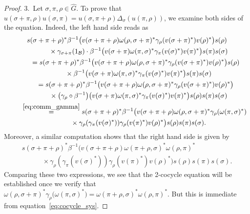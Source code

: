 \documentclass[10pt,a4paper]{amsart}
\numberwithin{equation}{section}
\newcommand*{\alg}{\mathcal}		%
\newcommand*{\one}{1}				%
\newcommand*{\aB}{\alg{B}} 			%
\begin{document}
\begin{proof}
3.~Let $\sigma, \pi, \rho \in \hat G$.
	To prove that $u(\sigma + \pi, \rho) u(\sigma, \pi)
	= u(\sigma, \pi + \rho) \Delta_\sigma ( u(\pi, \rho) )$, we examine both sides of the equation.
	Indeed, the left hand side reads as
	\begin{gather*}
s(\sigma + \pi + \rho)^* \beta^{-1}\big( v(\sigma + \pi + \rho) \omega(\rho,\sigma + \pi)^* \gamma_\rho (v(\sigma + \pi)^* ) v(\rho)^* \big) s(\rho)
		\\
\ \qquad\quad {}\times \gamma_{\sigma + \pi}(\one_\aB) \cdot \beta^{-1}\big( v(\sigma + \pi) \omega(\pi,\sigma)^* \gamma_\pi (v(\sigma)^* ) v(\pi)^*\big) s(\pi) s(\sigma)
		\\
\ \qquad{} =
		 s(\sigma + \pi + \rho)^* \beta^{-1}\big( v(\sigma + \pi + \rho) \omega(\rho,\sigma + \pi)^* \gamma_\rho (v(\sigma + \pi)^* ) v(\rho)^* \big) s(\rho)
		\\
\ \qquad\quad {} \times \beta^{-1}\big( v(\sigma + \pi) \omega(\pi,\sigma)^* \gamma_\pi (v(\sigma)^* ) v(\pi)^*\big) s(\pi) s(\sigma)
		\\
\ \qquad {} = s(\sigma + \pi + \rho)^* \beta^{-1}\big( v(\sigma + \pi + \rho) \omega(\rho,\sigma + \pi)^* \gamma_\rho (v(\sigma + \pi)^* ) v(\rho)^* \big)
		\\
\ \qquad \quad {}\times \big(\gamma_\rho \circ \beta^{-1} \big) \big( v(\sigma + \pi) \omega(\pi,\sigma)^* \gamma_\pi (v(\sigma)^* ) v(\pi)^*\big) s(\rho) s(\pi) s(\sigma)
		\\
\qquad{} \overset{\eqref{eq:comm_gamma}} {=}
		 s(\sigma + \pi + \rho)^* \beta^{-1}\big( v(\sigma + \pi + \rho) \omega(\rho,\sigma + \pi)^* \gamma_\rho ( \omega(\pi,\sigma)^* )
		\\
\ \qquad \quad {} \times \gamma_\rho ( \gamma_\pi ( v(\sigma)^* ) ) \gamma_\rho ( v(\pi)^* ) v(\rho)^* \big) s(\rho) s(\pi) s(\sigma).
	\end{gather*}
	Moreover, a similar computation shows that the right hand side is given by
	\begin{gather*}
	 s(\sigma + \pi +\rho)^* \beta^{-1}\big( v(\sigma + \pi + \rho) \omega(\pi + \rho,\sigma)^* \omega(\rho,\pi)^*
		\\			
\qquad \quad{}\times \gamma_\rho ( \gamma_\pi ( v(\sigma)^* ) ) \gamma_\rho ( v(\pi)^* ) v(\rho)^* \big) s(\rho) s(\pi) s(\sigma).	
	\end{gather*}
	Comparing these two expressions, we see that the 2-cocycle equation will be established once we verify that $\omega(\rho,\sigma + \pi)^* \gamma_\rho\big( \omega(\pi,\sigma)^* \big)= \omega(\pi + \rho,\sigma)^* \omega(\rho,\pi)^*$.
	But this is immediate from equation~\eqref{eq:cocycle_sys}.
\end{proof}
\end{document}
